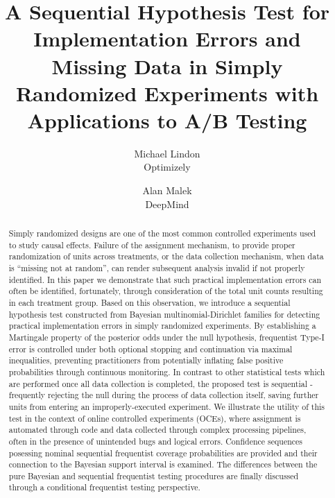 \documentclass[11pt]{article}
\begin{document}
\vspace{-1in}
\title{A Sequential Hypothesis Test for Implementation Errors and Missing Data in Simply Randomized Experiments with Applications to A/B Testing}
\author{\Large Michael Lindon \\ Optimizely \and \Large Alan Malek \\ DeepMind}
\maketitle 
\begin{abstract}
  Simply randomized designs are one of the most common controlled experiments used to study causal effects.
  Failure of the assignment mechanism, to provide proper randomization of units across treatments, or the data collection mechanism, when data is ``missing not at random'', can render subsequent analysis invalid if not properly identified.
In this paper we demonstrate that such practical implementation errors can often be identified, fortunately, through consideration of the total unit counts resulting in each treatment group.
  Based on this observation, we introduce a sequential hypothesis test constructed from Bayesian multinomial-Dirichlet families for detecting practical implementation errors in simply randomized experiments.
By establishing a Martingale property of the posterior odds under the null hypothesis, frequentist Type-I error is controlled under both optional stopping and continuation via maximal inequalities, preventing practitioners from potentially inflating false positive probabilities through continuous monitoring.
  In contrast to other statistical tests which are performed once all data collection is completed, the proposed test is sequential - frequently rejecting the null during the process of data collection itself, saving further units from entering an improperly-executed experiment.
  We illustrate the utility of this test in the context of online controlled experiments (OCEs), where assignment is automated through code and data collected through complex processing pipelines, often in the presence of unintended bugs and logical errors.
Confidence sequences posessing nominal sequential frequentist coverage probabilities are provided and their connection to the Bayesian support interval is examined.
The differences between the pure Bayesian and sequential frequentist testing procedures are finally discussed through a conditional frequentist testing perspective.
 
\end{abstract}
\end{document}
